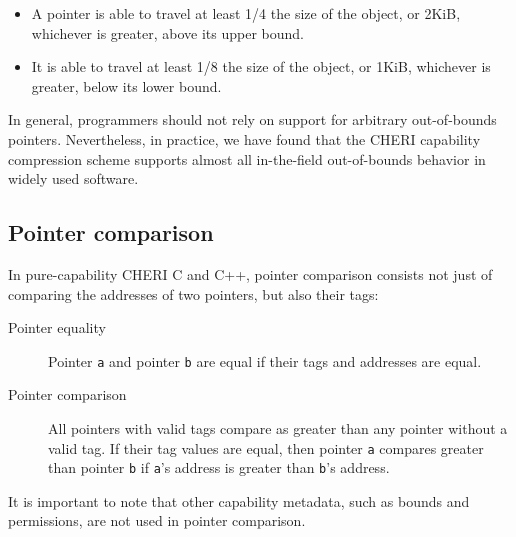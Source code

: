 \documentclass[11pt]{article}
\newcommand{\note}[2]{{\color{blue}[ Note: #1 - #2]}}
\renewcommand{\note}[2]{}
\newcommand{\arnote}[1]{\note{#1}{Alex R.}}
\newcommand{\rwnote}[1]{\note{#1}{Robert W.}}
\newcommand{\psnote}[1]{\note{#1}{Peter S.}}
\begin{document}
\begin{itemize}
\item A pointer is able to travel at least 1/4 the size of the object, or
  2KiB, whichever is greater, above its upper bound.

\item It is able to travel at least 1/8 the size of the object, or 1KiB,
  whichever is greater, below its lower bound.
\end{itemize}

In general, programmers should not rely on support for arbitrary out-of-bounds
pointers.  Nevertheless, in practice, we have found that the CHERI capability
compression scheme supports almost all in-the-field out-of-bounds behavior in
widely used software.  

\subsection{Pointer comparison}

In pure-capability CHERI C and C++, pointer comparison consists not just of
comparing the addresses of two pointers, but also their tags:

\begin{description}
\item[Pointer equality] Pointer \texttt{a} and pointer \texttt{b} are equal
  if their tags and addresses are equal.

\item[Pointer comparison] All pointers with valid tags compare as greater than
  any pointer without a valid tag.
  If their tag values are equal, then pointer \texttt{a} compares greater than
  pointer \texttt{b} if \texttt{a}'s address is greater than
  \texttt{b}'s address.
\end{description}

It is important to note that other capability metadata, such as bounds and
permissions, are not used in pointer comparison.

\rwnote{It would be nice to add a specific code example here, as we do already
  for some other cases, such as single-provenance pointer effects.}

\arnote{Unless you compile with -mllvm -cheri-exact-equals=true}

\psnote{hint why not?}

\psnote{So two pointers can compare equal but still not be
  equi-dereferencable (also true in de facto C, but only when one-past
  pointers are involved).}
\end{document}
